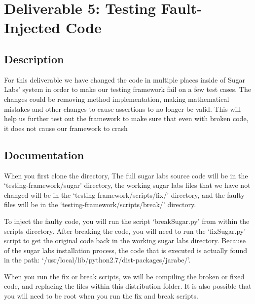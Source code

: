 \documentclass{article}
\begin{document}
\section{Deliverable 5: Testing Fault-Injected Code}
\subsection{Description}
For this deliverable we have changed the code in multiple places inside of Sugar Labs’ system in order to make our testing framework fail on a few test cases. The changes could be removing method implementation, making mathematical mistakes and other changes to cause assertions to no longer be valid. This will help us further test out the framework to make sure that even with broken code, it does not cause our framework to crash
\subsection{Documentation}
When you first clone the directory, The full sugar labs source code will be in the ‘testing-framework/sugar’ directory, the working sugar labs files that we have not changed will be in the ‘testing-framework/scripts/fix/’ directory, and the faulty files will be in the ‘testing-framework/scripts/break/’ directory. 

To inject the faulty code, you will run the script ‘breakSugar.py’ from within the scripts directory. After breaking the code, you will need to run the ‘fixSugar.py’ script to get the original code back in the working sugar labs directory. Because of the sugar labs installation process, the code that is executed is actually found in the path: ‘/usr/local/lib/python2.7/dist-packages/jarabe/’.

When you run the fix or break scripts, we will be compiling the broken or fixed code, and replacing the files within this distribution folder. It is also possible that you will need to be root when you run the fix and break scripts.
\end{document}
